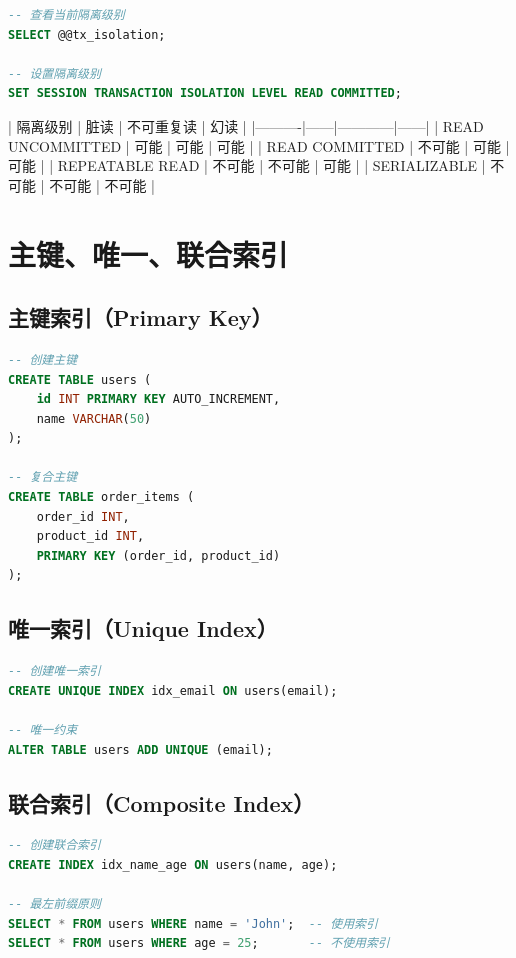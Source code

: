 \documentclass[12pt,UTF8]{ctexbook}
\begin{document}
\begin{lstlisting}[language=sql]
-- 查看当前隔离级别
SELECT @@tx_isolation;

-- 设置隔离级别
SET SESSION TRANSACTION ISOLATION LEVEL READ COMMITTED;
\end{lstlisting}

| 隔离级别 | 脏读 | 不可重复读 | 幻读 |
|----------|------|------------|------|
| READ UNCOMMITTED | 可能 | 可能 | 可能 |
| READ COMMITTED | 不可能 | 可能 | 可能 |
| REPEATABLE READ | 不可能 | 不可能 | 可能 |
| SERIALIZABLE | 不可能 | 不可能 | 不可能 |

\section{主键、唯一、联合索引}
\label{sec:index-types}

\subsection*{主键索引（Primary Key）}
\begin{lstlisting}[language=sql]
-- 创建主键
CREATE TABLE users (
    id INT PRIMARY KEY AUTO_INCREMENT,
    name VARCHAR(50)
);

-- 复合主键
CREATE TABLE order_items (
    order_id INT,
    product_id INT,
    PRIMARY KEY (order_id, product_id)
);
\end{lstlisting}

\subsection*{唯一索引（Unique Index）}
\begin{lstlisting}[language=sql]
-- 创建唯一索引
CREATE UNIQUE INDEX idx_email ON users(email);

-- 唯一约束
ALTER TABLE users ADD UNIQUE (email);
\end{lstlisting}

\subsection*{联合索引（Composite Index）}
\begin{lstlisting}[language=sql]
-- 创建联合索引
CREATE INDEX idx_name_age ON users(name, age);

-- 最左前缀原则
SELECT * FROM users WHERE name = 'John';  -- 使用索引
SELECT * FROM users WHERE age = 25;       -- 不使用索引
\end{lstlisting}
\end{document}
